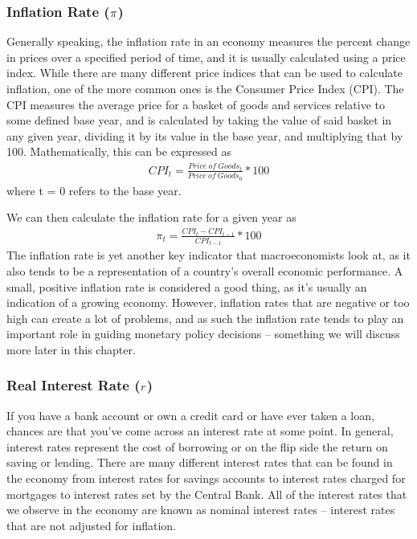 \documentclass[letterpaper,10pt,english]{jupyterBook}
\begin{document}
\subsubsection{Inflation Rate (\protect\(\pi\protect\))}
\label{\detokenize{content/09-macro/MacroChapter:inflation-rate-pi}}
\sphinxAtStartPar
Generally speaking, the inflation rate in an economy measures the percent change in prices over a specified period of time, and it is usually calculated using a price index. While there are many different price indices that can be used to calculate inflation, one of the more common ones is the Consumer Price Index (CPI). The CPI measures the average price for a basket of goods and services relative to some defined base year, and is calculated by taking the value of said basket in any given year, dividing it by its value in the base year, and multiplying that by 100. Mathematically, this can be expressed as
\begin{equation*}
\begin{split} CPI_t = \frac{Price~of~Goods_t}{Price~of~Goods_0} * 100\end{split}
\end{equation*}
\sphinxAtStartPar
where t = 0 refers to the base year.

\sphinxAtStartPar
We can then calculate the inflation rate for a given year as
\begin{equation*}
\begin{split} \pi_t = \frac{CPI_t - CPI_{t-1}}{CPI_{t-1}} * 100\end{split}
\end{equation*}
\sphinxAtStartPar
The inflation rate is yet another key indicator that macroeconomists look at, as it also tends to be a representation of a country’s overall economic performance. A small, positive inflation rate is considered a good thing, as it’s usually an indication of a growing economy. However, inflation rates that are negative or too high can create a lot of problems, and as such the inflation rate tends to play an important role in guiding monetary policy decisions – something we will discuss more later in this chapter.


\subsubsection{Real Interest Rate (\protect\(r\protect\))}
\label{\detokenize{content/09-macro/MacroChapter:real-interest-rate-r}}
\sphinxAtStartPar
If you have a bank account or own a credit card or have ever taken a loan, chances are that you’ve come across an interest rate at some point. In general, interest rates represent the cost of borrowing or on the flip side the return on saving or lending. There are many different interest rates that can be found in the economy from interest rates for savings accounts to interest rates charged for mortgages to interest rates set by the Central Bank. All of the interest rates that we observe in the economy are known as nominal interest rates – interest rates that are not adjusted for inflation.
\end{document}
